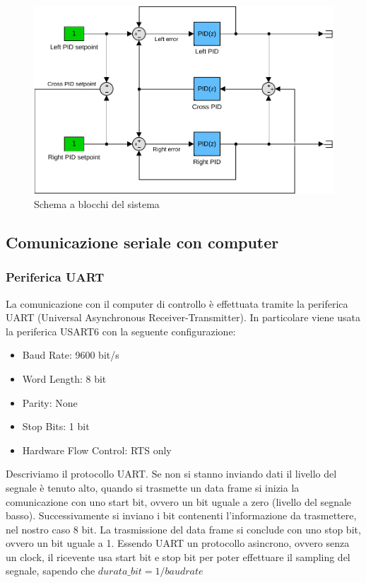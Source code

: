 \begin{figure}[H]
    \centering
    \includegraphics[width=\textwidth]{images/crosspid.pdf}
    \caption{Schema a blocchi del sistema}
    \label{fig:pid}
\end{figure}

\subsection{Comunicazione seriale con computer}

\subsubsection{Periferica UART}
La comunicazione con il computer di controllo è effettuata tramite la periferica UART (Universal Asynchronous Receiver-Transmitter). In particolare viene usata la periferica USART6 con la seguente configurazione:

\begin{itemize}
    \item Baud Rate: 9600 bit/s
    \item Word Length: 8 bit
    \item Parity: None
    \item Stop Bits: 1 bit
    \item Hardware Flow Control: RTS only
\end{itemize}

Descriviamo il protocollo UART. Se non si stanno inviando dati il livello del segnale è tenuto alto, quando si trasmette un data frame si inizia la comunicazione con uno start bit, ovvero un bit uguale a zero (livello del segnale basso). Successivamente si inviano i bit contenenti l'informazione da trasmettere, nel nostro caso 8 bit. La trasmissione del data frame si conclude con uno stop bit, ovvero un bit uguale a 1. Essendo UART un protocollo asincrono, ovvero senza un clock, il ricevente usa start bit e stop bit per poter effettuare il sampling del segnale, sapendo che $durata\_bit = 1/baud rate$

